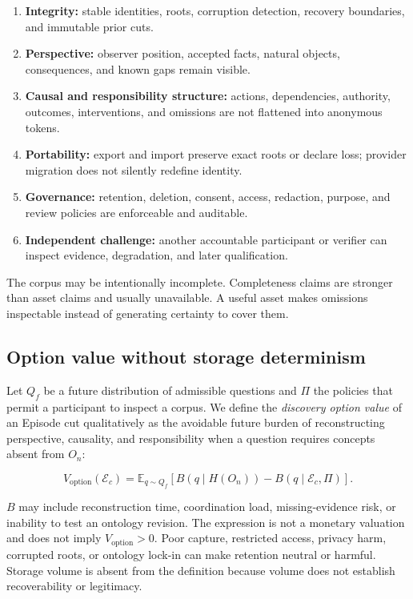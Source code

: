 \begin{enumerate}[leftmargin=*]
  \item \textbf{Integrity:} stable identities, roots, corruption detection,
        recovery boundaries, and immutable prior cuts.
  \item \textbf{Perspective:} observer position, accepted facts, natural
        objects, consequences, and known gaps remain visible.
  \item \textbf{Causal and responsibility structure:} actions, dependencies,
        authority, outcomes, interventions, and omissions are not flattened
        into anonymous tokens.
  \item \textbf{Portability:} export and import preserve exact roots or declare
        loss; provider migration does not silently redefine identity.
  \item \textbf{Governance:} retention, deletion, consent, access, redaction,
        purpose, and review policies are enforceable and auditable.
  \item \textbf{Independent challenge:} another accountable participant or
        verifier can inspect evidence, degradation, and later qualification.
\end{enumerate}

The corpus may be intentionally incomplete. Completeness claims are stronger
than asset claims and usually unavailable. A useful asset makes omissions
inspectable instead of generating certainty to cover them.

\subsection{Option value without storage determinism}

Let $Q_f$ be a future distribution of admissible questions and $\Pi$ the
policies that permit a participant to inspect a corpus. We define the
\emph{discovery option value} of an Episode cut qualitatively as the avoidable
future burden of reconstructing perspective, causality, and responsibility
when a question requires concepts absent from $O_n$:

\begin{equation}
V_{\mathrm{option}}(\mathcal{E}_c) =
\mathbb{E}_{q \sim Q_f}
\left[ B(q \mid H(O_n)) - B(q \mid \mathcal{E}_c, \Pi) \right].
\end{equation}

$B$ may include reconstruction time, coordination load, missing-evidence risk,
or inability to test an ontology revision. The expression is not a monetary
valuation and does not imply $V_{\mathrm{option}}>0$. Poor capture, restricted
access, privacy harm, corrupted roots, or ontology lock-in can make retention
neutral or harmful. Storage volume is absent from the definition because
volume does not establish recoverability or legitimacy.

